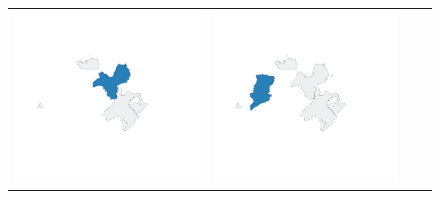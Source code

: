 \begin{figure}[p]
\begin{tabularx}{1\textwidth}{XXXX}
\includegraphics[width=1\linewidth]{images/ch6/loading/03}&
\includegraphics[width=1\linewidth]{images/ch6/loading/04} \\

\end{tabularx}
\end{figure}
